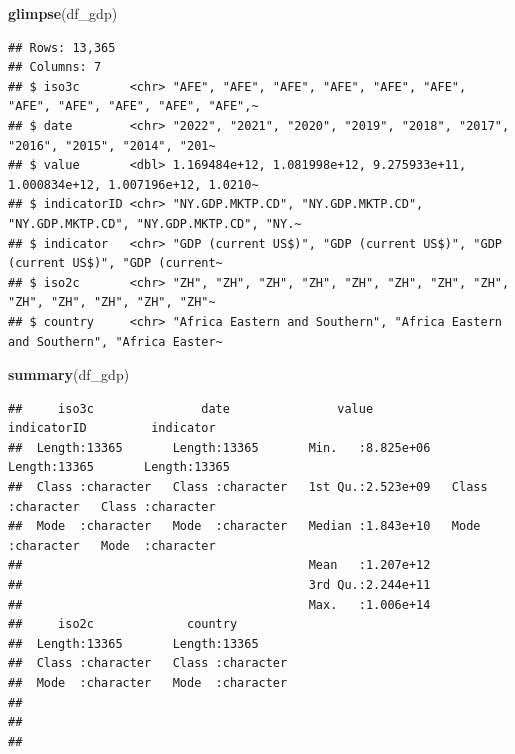 \documentclass[
  12pt,
  oneside]{book}
\newenvironment{Shaded}{\begin{snugshade}}{\end{snugshade}}
\newcommand{\FunctionTok}[1]{\textcolor[rgb]{0.13,0.29,0.53}{\textbf{#1}}}
\newcommand{\NormalTok}[1]{#1}
\theoremstyle{definition}
\theoremstyle{definition}
\theoremstyle{definition}
\theoremstyle{definition}
\theoremstyle{remark}
\begin{document}
\begin{Shaded}
\begin{Highlighting}[]
\FunctionTok{glimpse}\NormalTok{(df\_gdp)}
\end{Highlighting}
\end{Shaded}

\begin{verbatim}
## Rows: 13,365
## Columns: 7
## $ iso3c       <chr> "AFE", "AFE", "AFE", "AFE", "AFE", "AFE", "AFE", "AFE", "AFE", "AFE", "AFE",~
## $ date        <chr> "2022", "2021", "2020", "2019", "2018", "2017", "2016", "2015", "2014", "201~
## $ value       <dbl> 1.169484e+12, 1.081998e+12, 9.275933e+11, 1.000834e+12, 1.007196e+12, 1.0210~
## $ indicatorID <chr> "NY.GDP.MKTP.CD", "NY.GDP.MKTP.CD", "NY.GDP.MKTP.CD", "NY.GDP.MKTP.CD", "NY.~
## $ indicator   <chr> "GDP (current US$)", "GDP (current US$)", "GDP (current US$)", "GDP (current~
## $ iso2c       <chr> "ZH", "ZH", "ZH", "ZH", "ZH", "ZH", "ZH", "ZH", "ZH", "ZH", "ZH", "ZH", "ZH"~
## $ country     <chr> "Africa Eastern and Southern", "Africa Eastern and Southern", "Africa Easter~
\end{verbatim}

\begin{Shaded}
\begin{Highlighting}[]
\FunctionTok{summary}\NormalTok{(df\_gdp)}
\end{Highlighting}
\end{Shaded}

\begin{verbatim}
##     iso3c               date               value           indicatorID         indicator        
##  Length:13365       Length:13365       Min.   :8.825e+06   Length:13365       Length:13365      
##  Class :character   Class :character   1st Qu.:2.523e+09   Class :character   Class :character  
##  Mode  :character   Mode  :character   Median :1.843e+10   Mode  :character   Mode  :character  
##                                        Mean   :1.207e+12                                        
##                                        3rd Qu.:2.244e+11                                        
##                                        Max.   :1.006e+14                                        
##     iso2c             country         
##  Length:13365       Length:13365      
##  Class :character   Class :character  
##  Mode  :character   Mode  :character  
##                                       
##                                       
## 
\end{verbatim}
\end{document}
